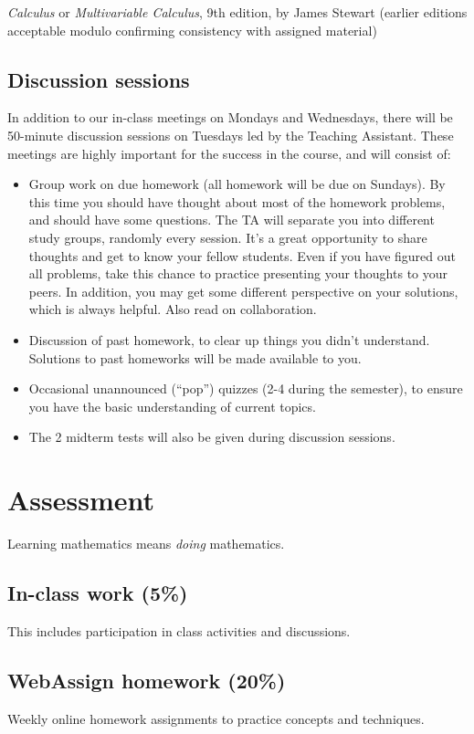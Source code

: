 \documentclass[oneside,11pt]{amsart}
\begin{document}
\emph{Calculus} or \emph{Multivariable Calculus}, 9th edition, by James Stewart (earlier editions acceptable modulo confirming consistency with assigned material)

\subsection{Discussion sessions} 

In addition to our in-class meetings on Mondays and Wednesdays, there will be 50-minute discussion sessions on Tuesdays led by the Teaching Assistant. These meetings are highly important for the success in the course, and will consist of:
\begin{itemize}
	\item 
	Group work on due homework (all homework will be due on Sundays). By this time you should have thought about most of the homework problems, and should have some questions. The TA will separate you into different study groups, randomly every session. It's a great opportunity to share thoughts and get to know your fellow students. Even if you have figured out all problems, take this chance to practice presenting your thoughts to your peers. In addition, you may get some different perspective on your solutions, which is always helpful. Also read  on collaboration.
	\item 
	Discussion of past homework, to clear up things you didn't understand. Solutions to past homeworks will be made available to you.
	\item Occasional unannounced (``pop'') quizzes (2-4 during the semester), to ensure you have the basic understanding of current topics.
	\item The 2 midterm tests will also be given during discussion sessions.
\end{itemize}

\section{Assessment}

Learning mathematics means \emph{doing} mathematics. 

\subsection{In-class work (5\%)} This includes participation in class activities and discussions.

\subsection{WebAssign homework (20\%)} Weekly online homework assignments to practice concepts and techniques.
\end{document}
